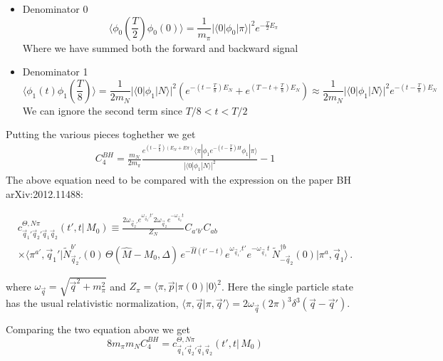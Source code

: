 \documentclass[10pt,a4paper]{article}
\begin{document}
\begin{itemize}
 \item Denominator 0
$$
\langle \phi_0(\frac{T}{2}) \phi_0(0)\rangle = \frac{1}{m_\pi}|\langle 0| \phi_0 | \pi\rangle|^2  e^{-\frac{T}{2}E_\pi}
$$
Where we have summed both the forward and backward signal

 \item Denominator 1
$$
\langle \phi_1(t) \phi_1(\frac{T}{8})\rangle = \frac{1}{2m_N}|\langle 0| \phi_1 | N\rangle|^2  \left(e^{- (t-\frac{T}{8})E_N}+  e^{(T-t+\frac{T}{8})E_N}  \right)
\approx\frac{1}{2m_N}|\langle 0| \phi_1 | N\rangle|^2  e^{- (t-\frac{T}{8})E_N}
$$
We can ignore the second term since $T/8<t<T/2$

\end{itemize}

Putting the various pieces toghether we get
\begin{gather}
C_4^{BH}=\frac{m_N}{ 2 m_\pi }\frac{
  e^{ (t-\frac{T}{8})(E_N+E\pi)} \langle \pi|   \phi_1 e^{-(t-\frac{T}{8})H}\phi_1 
 | \pi\rangle  
}{
 |\langle 0| \phi_1 | N\rangle|^2  
}-1
\end{gather}
The above equation need to be compared with the expression on the  paper BH arXiv:2012.11488:
\begin{tcolorbox}
{
 \begin{multline}
\label{eq:cThetaNpiDef}
c^{\Theta, N \pi}_{\vec q_1' \vec q_2' \vec q_1 \vec q_2}(t', t \vert \, M_0) \equiv \frac{ 2 \omega_{\vec q_2'} e^{\omega_{\vec q_2'} t' } 2 \omega_{\vec q_2 } e^{- \omega_{\vec q_2 } t } }{Z_N} C_{a'b'} C_{ab} \, \\
\times \langle \pi^{a'} , \vec q_1' \vert \widetilde N^{b'}_{ \vec q_2'}(0) \, \Theta(\hat M - M_0, \Delta) \, e^{- \hat H(t' - t)} e^{ \omega_{\vec q_1'} t'} e^{ - \omega_{\vec q_1} t} \, \widetilde N^{\dagger b}_{-\vec q_2}(0) \vert \pi^{a}, \vec q_1 \rangle \,.
\nonumber
\end{multline}
}
\end{tcolorbox}

\begin{tcolorbox}
where $\omega_{\vec q} = \sqrt{\vec q^2 + m_\pi^2}$ and $Z_\pi = \langle \pi, \vec p \vert \pi(0) \vert 0 \rangle^2$. Here the single particle state has the usual relativistic normalization, $\langle \pi, \vec q \vert \pi, \vec q' \rangle = 2 \omega_{\vec q} (2 \pi)^3 \delta^3(\vec q - \vec q')$.
\end{tcolorbox}
Comparing the two equation above we get 
\begin{equation}
8m_\pi m_N C_4^{BH}=  c^{\Theta, N \pi}_{\vec q_1' \vec q_2' \vec q_1 \vec q_2}(t', t \vert \, M_0)
\end{equation}
 
\end{document}
